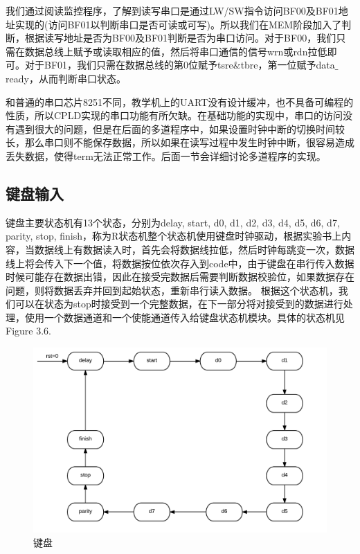 我们通过阅读监控程序，了解到读写串口是通过LW/SW指令访问BF00及BF01地址实现的(访问BF01以判断串口是否可读或可写)。所以我们在MEM阶段加入了判断，根据读写地址是否为BF00及BF01判断是否为串口访问。对于BF00，我们只需在数据总线上赋予或读取相应的值，然后将串口通信的信号wrn或rdn拉低即可。对于BF01，我们只需在数据总线的第0位赋予tsre$\&$tbre，第一位赋予data$\_$ready，从而判断串口状态。

和普通的串口芯片8251不同，教学机上的UART没有设计缓冲，也不具备可编程的性质，所以CPLD实现的串口功能有所欠缺。在基础功能的实现中，串口的访问没有遇到很大的问题，但是在后面的多道程序中，如果设置时钟中断的切换时间较长，那么串口则不能保存数据，所以如果在读写过程中发生时钟中断，很容易造成丢失数据，使得term无法正常工作。后面一节会详细讨论多道程序的实现。

\subsection{键盘输入}

键盘主要状态机有13个状态，分别为delay, start, d0, d1, d2, d3, d4, d5, d6, d7, parity, stop, finish，称为R状态机整个状态机使用键盘时钟驱动，根据实验书上内容，当数据线上有数据读入时，首先会将数据线拉低，然后时钟每跳变一次，数据线上将会传入下一个值，将数据按位依次存入到code中，由于键盘在串行传入数据时候可能存在数据出错，因此在接受完数据后需要判断数据校验位，如果数据存在问题，则将数据丢弃并回到起始状态，重新串行读入数据。
	根据这个状态机，我们可以在状态为stop时接受到一个完整数据，在下一部分将对接受到的数据进行处理，使用一个数据通道和一个使能通道传入给键盘状态机模块。具体的状态机见Figure 3.6.
\begin{figure}[H]
  \includegraphics[width=\linewidth]{Figures/keyboard_main.png}
  \caption{键盘}
\end{figure}

